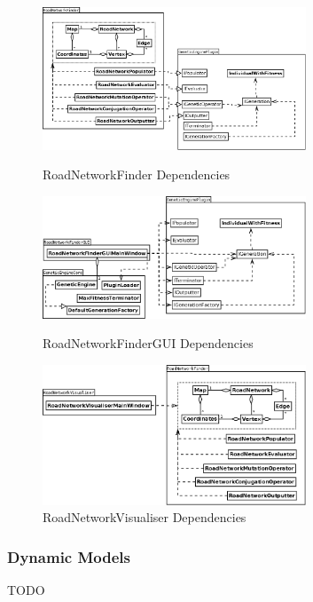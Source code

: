 \begin{figure}[ht!]
 \caption{RoadNetworkFinder Dependencies}
 \centering
 \includegraphics[width=0.7\textwidth]{../RoadNetworkFinder.png}\label{fig:RoadNetworkFinderDependencies}
\end{figure}

\begin{figure}[ht!]
 \caption{RoadNetworkFinderGUI Dependencies}
 \centering
 \includegraphics[width=0.7\textwidth]{../RoadNetworkFinderGUI.png}\label{fig:RoadNetworkFinderGUIDependencies}
\end{figure}

\begin{figure}[ht!]
 \caption{RoadNetworkVisualiser Dependencies}\label{fig:RoadNetworkVisualiserDependencies}
 \centering
 \includegraphics[width=0.7\textwidth]{../RoadNetworkVisualiser.png}
\end{figure}

\clearpage

\subsubsection{Dynamic Models}
TODO


